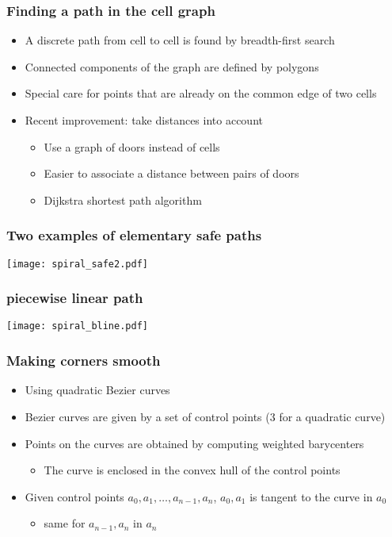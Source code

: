 \documentclass[compress]{beamer}
\begin{document}
\begin{frame}
\frametitle{Finding a path in the cell graph}
\begin{itemize}
\item A discrete path from cell to cell is found by breadth-first search
\item Connected components of the graph are defined by polygons
\item Special care for points that are already on the common edge of two cells
\item Recent improvement: take distances into account
\begin{itemize}
\item Use a graph of doors instead of cells
\item Easier to associate a distance between pairs of doors
\item Dijkstra shortest path algorithm
\end{itemize}
\end{itemize}
\end{frame}
\begin{frame}
\frametitle{Two examples of elementary safe paths}
\texttt{[image: spiral\_safe2.pdf]}
\end{frame}
\begin{frame}
\frametitle{piecewise linear path}
\label{broken-line}
\texttt{[image: spiral\_bline.pdf]}
\end{frame}
\begin{frame}
\frametitle{Making corners smooth}
\begin{itemize}
\item Using quadratic Bezier curves
\item Bezier curves are given by a set of control points
   (3 for a quadratic curve)
\item Points on the curves are obtained by computing weighted barycenters
\begin{itemize}
\item The curve is enclosed in the convex hull of the control points
\end{itemize}
\item Given control points \(a_0, a_1, \ldots, a_{n-1}, a_n\), \(a_0, a_1\)
is tangent to the curve in \(a_0\)
\begin{itemize}
\item same for \(a_{n-1}, a_n\) in \(a_n\)
\end{itemize}
\end{itemize}
\end{frame}
\end{document}
